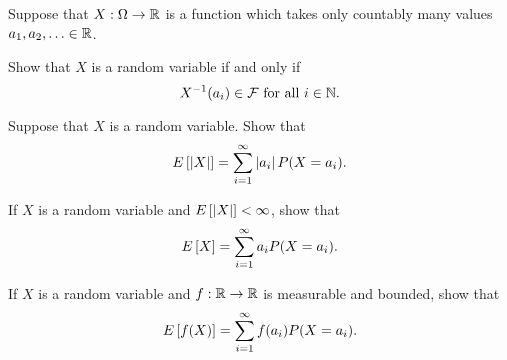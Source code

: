 \begin{exercise}{2.1}\label{ex:2.1}
    Suppose that $X:\Omega\to\mathbb{R}$ is a function which takes only countably 
    many values $a_1, a_2, \ldots\in\mathbb{R}$. 
    \begin{thmenum}
        \item Show that $X$ is a random variable if and only if 
        \begin{equation*}
            X^{-1}(a_i) \in \mathcal{F} \text{ for all } i\in\mathbb{N}.
        \end{equation*}
        \item Suppose that $X$ is a random variable. Show that 
        \begin{equation*}
            E\left[ {\left\lvert {X} \right\rvert} \right] = \sum_{i=1}^\infty \left\lvert {a_i} \right\rvert P(X = a_i).
        \end{equation*}
        \item If $X$ is a random variable and $E\left[ {\left\lvert {X} \right\rvert} \right]<\infty$, 
        show that 
        \begin{equation*}
            E\left[ {X} \right] = \sum_{i=1}^\infty a_i P(X = a_i).
        \end{equation*}
        \item If $X$ is a random variable and $f:\mathbb{R}\to\mathbb{R}$ is measurable and 
        bounded, show that 
        \begin{equation*}
            E\left[ {f(X)} \right] = \sum_{i=1}^\infty f(a_i) P(X = a_i).
        \end{equation*}
    \end{thmenum}
\end{exercise}
